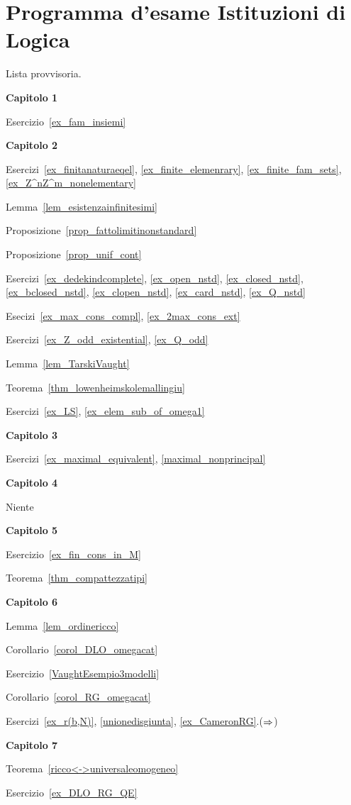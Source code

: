 \chapter*{Programma d'esame Istituzioni di Logica}\label{esame}

Lista provvisoria.

\textbf{Capitolo 1}

Esercizio~\ref{ex_fam_insiemi} 

\textbf{Capitolo 2}

Esercizi~\ref{ex_finitanaturaeqel}, \ref{ex_finite_elemenrary}, \ref{ex_finite_fam_sets}, \ref{ex_Z^nZ^m_nonelementary}

Lemma~\ref{lem_esistenzainfinitesimi}

Proposizione~\ref{prop_fattolimitinonstandard}

Proposizione~\ref{prop_unif_cont}

Esercizi~\ref{ex_dedekindcomplete}, \ref{ex_open_nstd}, \ref{ex_closed_nstd}, \ref{ex_bclosed_nstd}, \ref{ex_clopen_nstd}, \ref{ex_card_nstd}, \ref{ex_Q_nstd}

Esecizi~\ref{ex_max_cons_compl}, \ref{ex_2max_cons_ext}

Esercizi~\ref{ex_Z_odd_existential}, \ref{ex_Q_odd}

Lemma~\ref{lem_TarskiVaught}

Teorema~\ref{thm_lowenheimskolemallingiu}

Esercizi~\ref{ex_LS}, \ref{ex_elem_sub_of_omega1}

\textbf{Capitolo 3}

Esercizi~\ref{ex_maximal_equivalent}, \ref{maximal_nonprincipal}

\textbf{Capitolo 4}

Niente

\textbf{Capitolo 5}

Esercizio~\ref{ex_fin_cons_in_M}

Teorema~\ref{thm_compattezzatipi}

\textbf{Capitolo 6}

Lemma~\ref{lem_ordinericco}

Corollario~\ref{corol_DLO_omegacat}

Esercizio~\ref{VaughtEsempio3modelli}

Corollario~\ref{corol_RG_omegacat}

Esercizi~\ref{ex_r(b,N)}, \ref{unionedisgiunta}, \ref{ex_CameronRG}.($\Rightarrow$) 

\textbf{Capitolo 7}

Teorema~\ref{ricco<->universaleomogeneo}

Esercizio~\ref{ex_DLO_RG_QE}